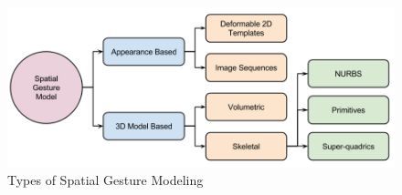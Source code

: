 \begin{figure}
	[h] \centering 
	\includegraphics[width=120mm]{figures/content/ges-model.jpg} \caption{Types of Spatial Gesture Modeling \cite{1}} \label{fg:ges:model} 
\end{figure}
